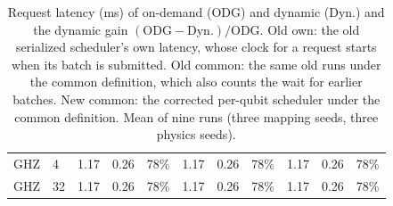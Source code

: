 \begin{table}[H]
{\begin{tabular}{@{}llrrrrrrrrr@{}}
GHZ & 4 & 1.17 & 0.26 & 78\% & 1.17 & 0.26 & 78\% & 1.17 & 0.26 & 78\% \\
GHZ & 32 & 1.17 & 0.26 & 78\% & 1.17 & 0.26 & 78\% & 1.17 & 0.26 & 78\% \\
\bottomrule
\end{tabular}}
\caption{Request latency (ms) of on-demand (ODG) and dynamic (Dyn.) and the dynamic gain $(\text{ODG}-\text{Dyn.})/\text{ODG}$. Old own: the old serialized scheduler's own latency, whose clock for a request starts when its batch is submitted. Old common: the same old runs under the common definition, which also counts the wait for earlier batches. New common: the corrected per-qubit scheduler under the common definition. Mean of nine runs (three mapping seeds, three physics seeds).}
\label{tab:legacy-vs-corrected}
\end{table}
